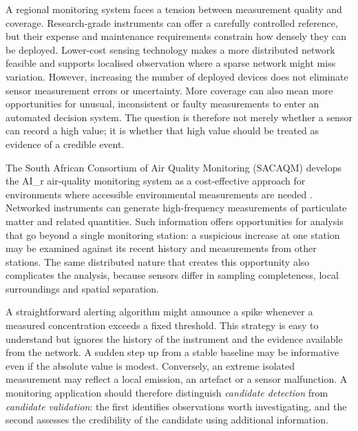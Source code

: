 \documentclass[12pt,a4paper,oneside]{report}
\begin{document}
A regional monitoring system faces a tension between measurement quality and coverage. Research-grade instruments can offer a carefully controlled reference, but their expense and maintenance requirements constrain how densely they can be deployed. Lower-cost sensing technology makes a more distributed network feasible and supports localised observation where a sparse network might miss variation. However, increasing the number of deployed devices does not eliminate sensor measurement errors or uncertainty. More coverage can also mean more opportunities for unusual, inconsistent or faulty measurements to enter an automated decision system. The question is therefore not merely whether a sensor can record a high value; it is whether that high value should be treated as evidence of a credible event.

The South African Consortium of Air Quality Monitoring (SACAQM) develops the AI\_r air-quality monitoring system as a cost-effective approach for environments where accessible environmental measurements are needed \citep{mckenzie2024}. Networked instruments can generate high-frequency measurements of particulate matter and related quantities. Such information offers opportunities for analysis that go beyond a single monitoring station: a suspicious increase at one station may be examined against its recent history and measurements from other stations. The same distributed nature that creates this opportunity also complicates the analysis, because sensors differ in sampling completeness, local surroundings and spatial separation.

A straightforward alerting algorithm might announce a spike whenever a measured concentration exceeds a fixed threshold. This strategy is easy to understand but ignores the history of the instrument and the evidence available from the network. A sudden step up from a stable baseline may be informative even if the absolute value is modest. Conversely, an extreme isolated measurement may reflect a local emission, an artefact or a sensor malfunction. A monitoring application should therefore distinguish \emph{candidate detection} from \emph{candidate validation}: the first identifies observations worth investigating, and the second assesses the credibility of the candidate using additional information.
\end{document}

